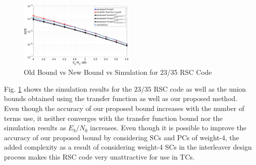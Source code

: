 \begin{figure}[htbp]
	\centering
	\includegraphics[width=0.5\textwidth]{./Images/RSC_23_35_lower_weights2.eps}
	\caption{Old Bound vs New Bound vs Simulation for 23/35 RSC Code}
	\label{simFig3}
\end{figure}
Fig. \ref{simFig3} shows the simulation results for the $23/35$ RSC code as well as the union bounds obtained using the transfer function as well as our proposed method. Even though the accuracy of our proposed bound increases with the number of terms use, it neither converges with the transfer function bound nor the simulation results as $E_b/N_0$ increases. Even though it is possible to improve the accuracy of our proposed bound by considering SCs and PCs of weight-4, the added complexity as a result of considering weight-4 SCs in the interleaver design process makes this RSC code very unattractive for use in TCs. 






